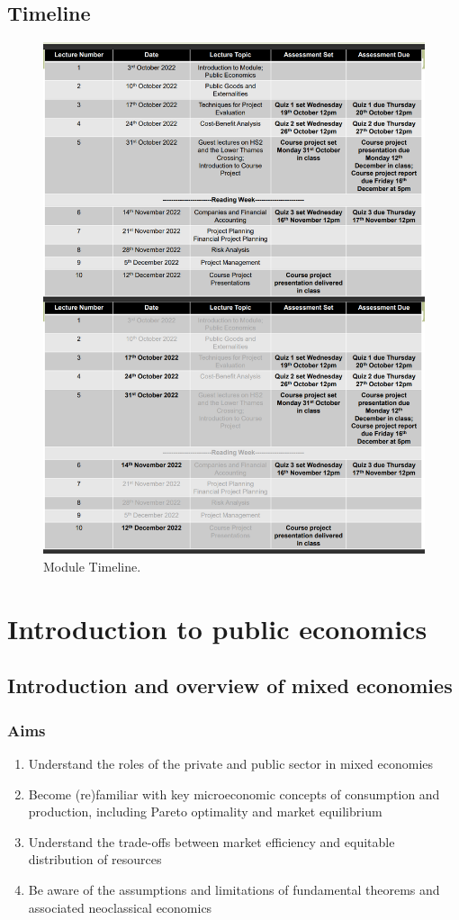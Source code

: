 \section{Timeline}
\begin{figure}[H]
  \centering
  \includegraphics[width = 0.9 \textwidth]{./img/figure2.png}
  \caption{Module Timeline.}
\end{figure}
\chapter{Introduction to public economics}
\section{Introduction and overview of mixed economies}
\subsection{Aims}
\begin{enumerate}
  \item Understand the roles of the private and public sector in mixed economies
  \item Become (re)familiar with key microeconomic concepts of consumption and production, including Pareto optimality and market equilibrium
  \item Understand the trade-offs between market efficiency and equitable distribution of resources
  \item Be aware of the assumptions and limitations of fundamental theorems and associated neoclassical economics
\end{enumerate}
